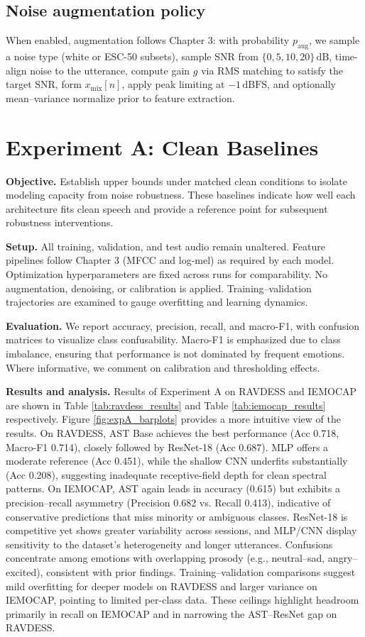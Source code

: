 \subsection{Noise augmentation policy}
When enabled, augmentation follows Chapter 3: with probability \(p_{\mathrm{aug}}\), we sample a noise type (white or ESC-50 subsets), sample SNR from \(\{0,5,10,20\}\,\mathrm{dB}\), time-align noise to the utterance, compute gain \(g\) via RMS matching to satisfy the target SNR, form \(x_{\mathrm{mix}}[n]\), apply peak limiting at \(-1\,\mathrm{dBFS}\), and optionally mean–variance normalize prior to feature extraction.

\section{Experiment A: Clean Baselines}
\textbf{Objective.} Establish upper bounds under matched clean conditions to isolate modeling capacity from noise robustness. These baselines indicate how well each architecture fits clean speech and provide a reference point for subsequent robustness interventions.

\textbf{Setup.} All training, validation, and test audio remain unaltered. Feature pipelines follow Chapter 3 (MFCC and log-mel) as required by each model. Optimization hyperparameters are fixed across runs for comparability. No augmentation, denoising, or calibration is applied. Training–validation trajectories are examined to gauge overfitting and learning dynamics.

\textbf{Evaluation.} We report accuracy, precision, recall, and macro-F1, with confusion matrices to visualize class confusability. Macro-F1 is emphasized due to class imbalance, ensuring that performance is not dominated by frequent emotions. Where informative, we comment on calibration and thresholding effects.

\textbf{Results and analysis.} Results of Experiment A on RAVDESS and IEMOCAP are shown in Table \ref{tab:ravdess_results} and Table \ref{tab:iemocap_results} respectively. Figure \ref{fig:expA_barplots} provides a more intuitive view of the results. On RAVDESS, AST Base achieves the best performance (Acc 0.718, Macro-F1 0.714), closely followed by ResNet-18 (Acc 0.687). MLP offers a moderate reference (Acc 0.451), while the shallow CNN underfits substantially (Acc 0.208), suggesting inadequate receptive-field depth for clean spectral patterns. On IEMOCAP, AST again leads in accuracy (0.615) but exhibits a precision–recall asymmetry (Precision 0.682 vs. Recall 0.413), indicative of conservative predictions that miss minority or ambiguous classes. ResNet-18 is competitive yet shows greater variability across sessions, and MLP/CNN display sensitivity to the dataset’s heterogeneity and longer utterances. Confusions concentrate among emotions with overlapping prosody (e.g., neutral–sad, angry–excited), consistent with prior findings. Training–validation comparisons suggest mild overfitting for deeper models on RAVDESS and larger variance on IEMOCAP, pointing to limited per-class data. These ceilings highlight headroom primarily in recall on IEMOCAP and in narrowing the AST–ResNet gap on RAVDESS.





